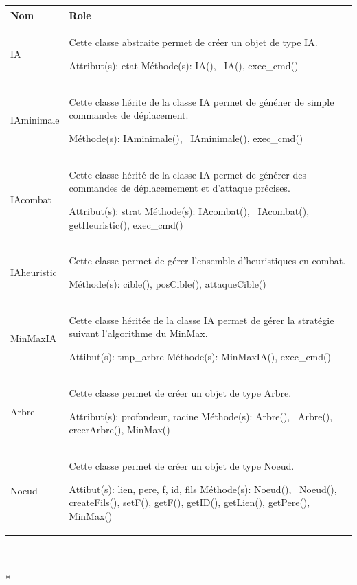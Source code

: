 \documentclass[11pt, a4paper]{article}
\begin{document}
\begin{tabularx}{\textwidth}{ |l|X| }
\hline
   \textbf{Nom} & \textbf{Role}
 \\
\hline

   IA & Cette classe abstraite permet de créer un objet de type IA.
   
Attribut(s): etat
\newline
Méthode(s): IA(), ~IA(), exec\_cmd()
 \\
\hline

    IAminimale & Cette classe hérite de la classe IA permet de généner de simple commandes de déplacement.

Méthode(s): IAminimale(), ~IAminimale(), exec\_cmd()
  \\
\hline

    IAcombat & Cette classe hérité de la classe IA permet de générer des commandes de déplacemement et d'attaque précises.
    
Attribut(s): strat
\newline
Méthode(s): IAcombat(), ~IAcombat(), getHeuristic(), exec\_cmd()
  \\
\hline

    IAheuristic & Cette classe permet de gérer l'ensemble d'heuristiques en combat.

Méthode(s): cible(), posCible(), attaqueCible()
  \\
\hline

    MinMaxIA & Cette classe héritée de la classe IA permet de gérer la stratégie suivant l'algorithme du MinMax.

Attibut(s): tmp\_arbre
\newline
Méthode(s): MinMaxIA(), exec\_cmd()
  \\
\hline

    Arbre & Cette classe permet de créer un objet de type Arbre.
    
Attribut(s): profondeur, racine
\newline
Méthode(s): Arbre(), ~Arbre(), creerArbre(), MinMax()
  \\
\hline

    Noeud & Cette classe permet de créer un objet de type Noeud.
    
Attibut(s): lien, pere, f, id, fils
\newline
Méthode(s): Noeud(), ~Noeud(), createFils(), setF(), getF(), getID(), getLien(), getPere(), MinMax()
  \\
\hline

\end{tabularx}\\ \\*
\end{document}
